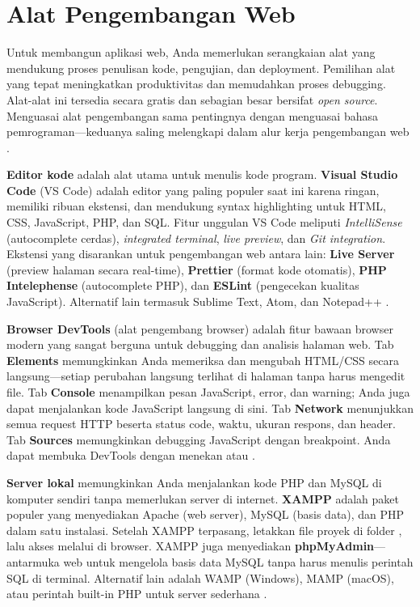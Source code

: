 \section{Alat Pengembangan Web}
Untuk membangun aplikasi web, Anda memerlukan serangkaian alat yang mendukung proses penulisan kode, pengujian, dan deployment. Pemilihan alat yang tepat meningkatkan produktivitas dan memudahkan proses debugging. Alat-alat ini tersedia secara gratis dan sebagian besar bersifat \textit{open source}. Menguasai alat pengembangan sama pentingnya dengan menguasai bahasa pemrograman---keduanya saling melengkapi dalam alur kerja pengembangan web \cite{mdnLearn}.

\textbf{Editor kode} adalah alat utama untuk menulis kode program. \textbf{Visual Studio Code} (VS Code) adalah editor yang paling populer saat ini karena ringan, memiliki ribuan ekstensi, dan mendukung syntax highlighting untuk HTML, CSS, JavaScript, PHP, dan SQL. Fitur unggulan VS Code meliputi \textit{IntelliSense} (autocomplete cerdas), \textit{integrated terminal}, \textit{live preview}, dan \textit{Git integration}. Ekstensi yang disarankan untuk pengembangan web antara lain: \textbf{Live Server} (preview halaman secara real-time), \textbf{Prettier} (format kode otomatis), \textbf{PHP Intelephense} (autocomplete PHP), dan \textbf{ESLint} (pengecekan kualitas JavaScript). Alternatif lain termasuk Sublime Text, Atom, dan Notepad++ \cite{w3schoolsTutorials}.

\textbf{Browser DevTools} (alat pengembang browser) adalah fitur bawaan browser modern yang sangat berguna untuk debugging dan analisis halaman web. Tab \textbf{Elements} memungkinkan Anda memeriksa dan mengubah HTML/CSS secara langsung---setiap perubahan langsung terlihat di halaman tanpa harus mengedit file. Tab \textbf{Console} menampilkan pesan JavaScript, error, dan warning; Anda juga dapat menjalankan kode JavaScript langsung di sini. Tab \textbf{Network} menunjukkan semua request HTTP beserta status code, waktu, ukuran respons, dan header. Tab \textbf{Sources} memungkinkan debugging JavaScript dengan breakpoint. Anda dapat membuka DevTools dengan menekan  atau  \cite{mdnToolsTesting}.

\textbf{Server lokal} memungkinkan Anda menjalankan kode PHP dan MySQL di komputer sendiri tanpa memerlukan server di internet. \textbf{XAMPP} adalah paket populer yang menyediakan Apache (web server), MySQL (basis data), dan PHP dalam satu instalasi. Setelah XAMPP terpasang, letakkan file proyek di folder , lalu akses melalui  di browser. XAMPP juga menyediakan \textbf{phpMyAdmin}---antarmuka web untuk mengelola basis data MySQL tanpa harus menulis perintah SQL di terminal. Alternatif lain adalah WAMP (Windows), MAMP (macOS), atau perintah built-in PHP  untuk server sederhana \cite{phpManual}.


